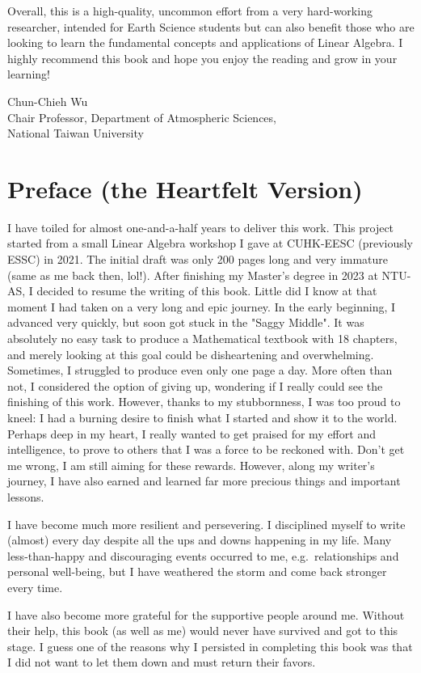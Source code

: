 Overall, this is a high-quality, uncommon effort from a very hard-working researcher, intended for Earth Science students but can also benefit those who are looking to learn the fundamental concepts and applications of Linear Algebra. I highly recommend this book and hope you enjoy the reading and grow in your learning!

{\raggedleft Chun-Chieh Wu\\
Chair Professor, Department of Atmospheric Sciences,\\
National Taiwan University \par}

\chapter*{Preface (the Heartfelt Version)}
I have toiled for almost one-and-a-half years to deliver this work. This project started from a small Linear Algebra workshop I gave at CUHK-EESC (previously ESSC) in 2021. The initial draft was only 200 pages long and very immature (same as me back then, lol!). After finishing my Master's degree in 2023 at NTU-AS, I decided to resume the writing of this book. Little did I know at that moment I had taken on a very long and epic journey. In the early beginning, I advanced very quickly, but soon got stuck in the "Saggy Middle". It was absolutely no easy task to produce a Mathematical textbook with 18 chapters, and merely looking at this goal could be disheartening and overwhelming. Sometimes, I struggled to produce even only one page a day. More often than not, I considered the option of giving up, wondering if I really could see the finishing of this work. However, thanks to my stubbornness, I was too proud to kneel: I had a burning desire to finish what I started and show it to the world. Perhaps deep in my heart, I really wanted to get praised for my effort and intelligence, to prove to others that I was a force to be reckoned with. Don't get me wrong, I am still aiming for these rewards. However, along my writer's journey, I have also earned and learned far more precious things and important lessons.

I have become much more resilient and persevering. I disciplined myself to write (almost) every day despite all the ups and downs happening in my life. Many less-than-happy and discouraging events occurred to me, e.g.\ relationships and personal well-being, but I have weathered the storm and come back stronger every time.

I have also become more grateful for the supportive people around me. Without their help, this book (as well as me) would never have survived and got to this stage. I guess one of the reasons why I persisted in completing this book was that I did not want to let them down and must return their favors.


